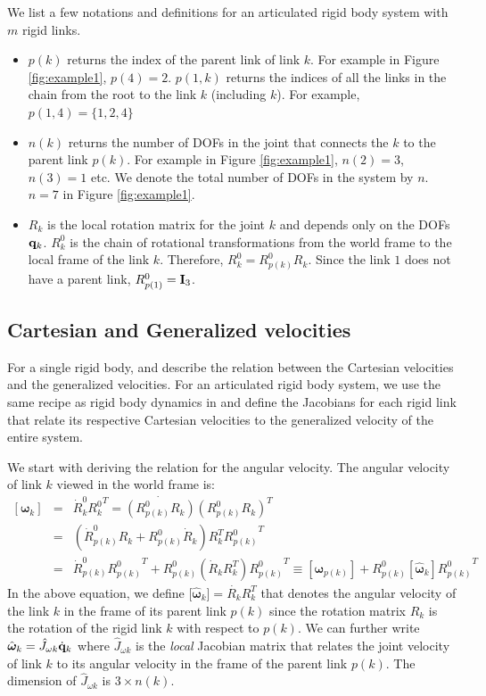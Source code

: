 We list a few notations and definitions for an articulated rigid body system with $m$ rigid links. 
\begin{itemize}
\item $p(k)$ returns the index of the parent link of link $k$. For
  example in Figure \ref{fig:example1}, $p(4) = 2$. $p(1,k)$ returns the indices of all the links in the chain from the root to the link $k$ (including $k$). For example, $p(1,4) = \{1,2,4\}$
\item $n(k)$ returns the number of DOFs in the joint that connects the $k$ to the parent link $p(k)$. For example in Figure \ref{fig:example1}, $n(2) = 3$, $n(3) = 1$ etc. We denote the total number of DOFs in the system by $n$. \eg $n=7$ in Figure \ref{fig:example1}.
\item $R_k$ is the local rotation matrix for the joint $k$ and depends only on the DOFs $\mathbf{q}_k$. $R^0_k$ is the chain of rotational transformations from the
  world frame to the local frame of the link $k$. Therefore, $R^0_k = R^0_{p(k)}R_k$. Since the link $1$ does not have a parent link, $R^0_{p(1)} = \mathbf{I}_3$.
\end{itemize}



\subsection{Cartesian and Generalized velocities}

For a single rigid body,  and  describe the relation between the Cartesian velocities and the generalized velocities. 
For an articulated rigid body system, we use the same recipe as rigid body dynamics in  and define the Jacobians for each rigid link that relate its respective Cartesian velocities to the generalized velocity of the entire system. 

We start with deriving the relation for the angular velocity. The angular velocity of link $k$ viewed in the world frame is:
\begin{eqnarray}
\nonumber
[\bm{\omega}_k] & = & \dot{R}^0_k {R^0_k}^T = \dot{(R^0_{p(k)}R_k)} (R^0_{p(k)}R_k)^T\\
\nonumber
& = & (\dot{R}^0_{p(k)}R_k + {R^0_{p(k)}}\dot{R}_k)  R_k^T {R^0_{p(k)}}^T \\
\label{eq:angvelk_recursive}
& = & \dot{R}^0_{p(k)}{R^0_{p(k)}}^T + R^0_{p(k)} \left ( \dot{R}_k R_k^T \right ) {R^0_{p(k)}}^T \equiv [\bm{\omega}_{p(k)}] + R^0_{p(k)} [\hat{\bm{\omega}}_k] {R^0_{p(k)}}^T
\end{eqnarray}
In the above equation, we define [$\hat{\bm{\omega}}_k] = \dot{R_k} R_k^T$ that denotes the angular velocity of the link $k$ in the frame of its parent link $p(k)$ since the rotation matrix $R_k$ is the rotation of the rigid link $k$ with respect to $p(k)$. We can further write $\hat{\bm{\omega}}_k = \hat{J}_{\omega k} \dot{\mathbf{q}}_k$ where $\hat{J}_{\omega k}$ is the \emph{local} Jacobian matrix that relates the joint velocity of link $k$ to its angular velocity in the frame of the parent link $p(k)$. The dimension of $\hat{J}_{\omega k}$ is $3\times n(k)$. 

